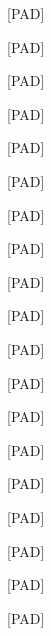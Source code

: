 \documentclass[varwidth=150mm]{standalone}
\begin{document}
\begin{CJK*}{UTF8}{gbsn}
{{{\colorbox{red!0.0}{\strut [PAD]} \colorbox{red!0.0}{\strut [PAD]} \colorbox{red!0.0}{\strut [PAD]} \colorbox{red!0.0}{\strut [PAD]} \colorbox{red!0.0}{\strut [PAD]} \colorbox{red!0.0}{\strut [PAD]} \colorbox{red!0.0}{\strut [PAD]} \colorbox{red!0.0}{\strut [PAD]} \colorbox{red!0.0}{\strut [PAD]} \colorbox{red!0.0}{\strut [PAD]} \colorbox{red!0.0}{\strut [PAD]} \colorbox{red!0.0}{\strut [PAD]} \colorbox{red!0.0}{\strut [PAD]} \colorbox{red!0.0}{\strut [PAD]} \colorbox{red!0.0}{\strut [PAD]} \colorbox{red!0.0}{\strut [PAD]} \colorbox{red!0.0}{\strut [PAD]} \colorbox{red!0.0}{\strut [PAD]} \colorbox{red!0.0}{\strut [PAD]}
}}}
\end{CJK*}
\end{document}
